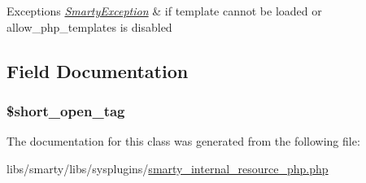 \begin{DoxyExceptions}{Exceptions}
{\em \hyperlink{class_smarty_exception}{Smarty\+Exception}} & if template cannot be loaded or allow\+\_\+php\+\_\+templates is disabled \\
\hline
\end{DoxyExceptions}


\subsection{Field Documentation}
\hypertarget{class_smarty___internal___resource___p_h_p_a28ea89bb1378d44fc14ac8d284bc73b6}{}
\subsubsection[{\$short\+\_\+open\+\_\+tag}]{\setlength{\rightskip}{0pt plus 5cm}\$short\+\_\+open\+\_\+tag\hspace{0.3cm}{\ttfamily [protected]}}\label{class_smarty___internal___resource___p_h_p_a28ea89bb1378d44fc14ac8d284bc73b6}


The documentation for this class was generated from the following file\+:\begin{DoxyCompactItemize}
\item 
libs/smarty/libs/sysplugins/\hyperlink{smarty__internal__resource__php_8php}{smarty\+\_\+internal\+\_\+resource\+\_\+php.\+php}\end{DoxyCompactItemize}
